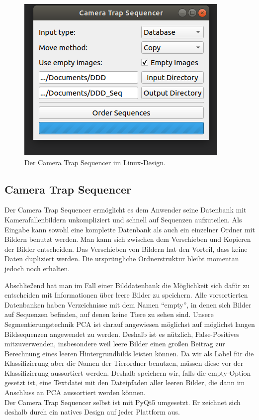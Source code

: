 \begin{figure}
	\centering
	\includegraphics[scale=0.5]{img/CameraTrapSequencer.png}
	\caption{Der Camera Trap Sequencer im Linux-Design.}
\end{figure}

\subsection{Camera Trap Sequencer}

Der Camera Trap Sequencer ermöglicht es dem Anwender seine Datenbank mit Kamerafallenbildern unkompliziert und schnell auf Sequenzen aufzuteilen. Als Eingabe kann sowohl eine komplette Datenbank als auch ein einzelner Ordner mit Bildern benutzt werden. Man kann sich zwischen dem Verschieben und Kopieren der Bilder entscheiden. Das Verschieben von Bildern hat den Vorteil, dass keine Daten dupliziert werden. Die ursprüngliche Ordnerstruktur bleibt momentan jedoch noch erhalten. 

Abschließend hat man im Fall einer Bilddatenbank die Möglichkeit sich dafür zu entscheiden mit Informationen über leere Bilder zu speichern. Alle vorsortierten Datenbanken haben Verzeichnisse mit dem Namen \enquote{empty}, in denen sich Bilder auf Sequenzen befinden, auf denen keine Tiere zu sehen sind. Unsere Segmentierungstechnik PCA ist darauf angewiesen möglichst auf möglichst langen Bildsequenzen angewendet zu werden. Deshalb ist es nützlich, False-Positives mitzuverwenden, insbesondere weil leere Bilder einen großen Beitrag zur Berechnung eines leeren Hintergrundbilds leisten können. Da wir als Label für die Klassifizierung aber die Namen der Tierordner benutzen, müssen diese vor der Klassifizierung aussortiert werden. Deshalb speichern wir, falls die empty-Option gesetzt ist, eine Textdatei mit den Dateipfaden aller leeren Bilder, die dann im Anschluss an PCA aussortiert werden können. \\
Der Camera Trap Sequencer selbst ist mit PyQt5 umgesetzt. Er zeichnet sich deshalb durch ein natives Design auf jeder Plattform aus.
